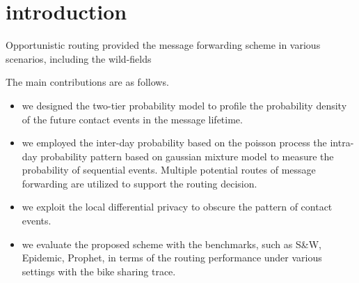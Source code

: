 \section{introduction}
\label{sec:introduction}
Opportunistic routing provided the message forwarding scheme
in various scenarios, including the wild-fields

The main contributions are as follows.
\begin{itemize}
\item {we designed the two-tier probability model
to profile the probability density of the future contact events
in the message lifetime.}
\item {we employed the inter-day probability based on the poisson process
the intra-day probability pattern based on gaussian mixture model
to measure the probability of sequential events.
Multiple potential routes of message forwarding
are utilized to support the routing decision.}
\item {we exploit the local differential privacy 
to obscure the pattern of contact events.}
\item {we evaluate the proposed scheme with the benchmarks,
such as S\&W, Epidemic, Prophet,
in terms of the routing performance under various settings
with the bike sharing trace.}
\end{itemize}

